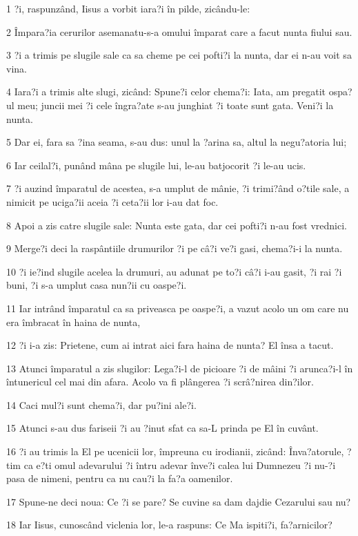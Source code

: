 \par 1 ?i, raspunzând, Iisus a vorbit iara?i în pilde, zicându-le:
\par 2 Împara?ia cerurilor asemanatu-s-a omului împarat care a facut nunta fiului sau.
\par 3 ?i a trimis pe slugile sale ca sa cheme pe cei pofti?i la nunta, dar ei n-au voit sa vina.
\par 4 Iara?i a trimis alte slugi, zicând: Spune?i celor chema?i: Iata, am pregatit ospa?ul meu; juncii mei ?i cele îngra?ate s-au junghiat ?i toate sunt gata. Veni?i la nunta.
\par 5 Dar ei, fara sa ?ina seama, s-au dus: unul la ?arina sa, altul la negu?atoria lui;
\par 6 Iar ceilal?i, punând mâna pe slugile lui, le-au batjocorit ?i le-au ucis.
\par 7 ?i auzind împaratul de acestea, s-a umplut de mânie, ?i trimi?ând o?tile sale, a nimicit pe uciga?ii aceia ?i ceta?ii lor i-au dat foc.
\par 8 Apoi a zis catre slugile sale: Nunta este gata, dar cei pofti?i n-au fost vrednici.
\par 9 Merge?i deci la raspântiile drumurilor ?i pe câ?i ve?i gasi, chema?i-i la nunta.
\par 10 ?i ie?ind slugile acelea la drumuri, au adunat pe to?i câ?i i-au gasit, ?i rai ?i buni, ?i s-a umplut casa nun?ii cu oaspe?i.
\par 11 Iar intrând împaratul ca sa priveasca pe oaspe?i, a vazut acolo un om care nu era îmbracat în haina de nunta,
\par 12 ?i i-a zis: Prietene, cum ai intrat aici fara haina de nunta? El însa a tacut.
\par 13 Atunci împaratul a zis slugilor: Lega?i-l de picioare ?i de mâini ?i arunca?i-l în întunericul cel mai din afara. Acolo va fi plângerea ?i scrâ?nirea din?ilor.
\par 14 Caci mul?i sunt chema?i, dar pu?ini ale?i.
\par 15 Atunci s-au dus fariseii ?i au ?inut sfat ca sa-L prinda pe El în cuvânt.
\par 16 ?i au trimis la El pe ucenicii lor, împreuna cu irodianii, zicând: Înva?atorule, ?tim ca e?ti omul adevarului ?i întru adevar înve?i calea lui Dumnezeu ?i nu-?i pasa de nimeni, pentru ca nu cau?i la fa?a oamenilor.
\par 17 Spune-ne deci noua: Ce ?i se pare? Se cuvine sa dam dajdie Cezarului sau nu?
\par 18 Iar Iisus, cunoscând viclenia lor, le-a raspuns: Ce Ma ispiti?i, fa?arnicilor?
